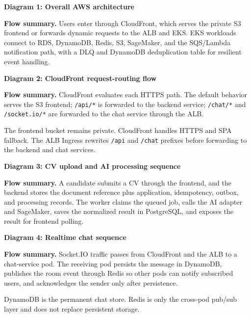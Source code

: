 \vspace{0.5em}\noindent\textbf{Diagram 1: Overall AWS
architecture}\par

\textbf{Flow summary.} Users enter through CloudFront, which serves the
private S3 frontend or forwards dynamic requests to the ALB and EKS. EKS
workloads connect to RDS, DynamoDB, Redis, S3, SageMaker, and the
SQS/Lambda notification path, with a DLQ and DynamoDB deduplication
table for resilient event handling.

\vspace{0.5em}\noindent\textbf{Diagram 2: CloudFront request-routing
flow}\par

\textbf{Flow summary.} CloudFront evaluates each HTTPS path. The default
behavior serves the S3 frontend; \texttt{/\allowbreak{}api/\allowbreak{}*} is forwarded to the
backend service; \texttt{/\allowbreak{}chat/\allowbreak{}*} and \texttt{/\allowbreak{}socket.\allowbreak{}io/\allowbreak{}*} are
forwarded to the chat service through the ALB.

The frontend bucket remains private. CloudFront handles HTTPS and SPA
fallback. The ALB Ingress rewrites \texttt{/\allowbreak{}api} and \texttt{/\allowbreak{}chat}
prefixes before forwarding to the backend and chat services.

\vspace{0.5em}\noindent\textbf{Diagram 3: CV upload and AI processing
sequence}\par

\textbf{Flow summary.} A candidate submits a CV through the frontend,
and the backend stores the document reference plus application,
idempotency, outbox, and processing records. The worker claims the
queued job, calls the AI adapter and SageMaker, saves the normalized
result in PostgreSQL, and exposes the result for frontend polling.

\vspace{0.5em}\noindent\textbf{Diagram 4: Realtime chat
sequence}\par

\textbf{Flow summary.} Socket.IO traffic passes from CloudFront and the
ALB to a chat-service pod. The receiving pod persists the message in
DynamoDB, publishes the room event through Redis so other pods can
notify subscribed users, and acknowledges the sender only after
persistence.

DynamoDB is the permanent chat store. Redis is only the cross-pod
pub/sub layer and does not replace persistent storage.

